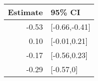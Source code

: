 \begin{tabular}{rl}
  \hline
Estimate & 95\% CI \\ 
  \hline
-0.53 & [-0.66,-0.41] \\ 
  0.10 & [-0.01,0.21] \\ 
  -0.17 & [-0.56,0.23] \\ 
  -0.29 & [-0.57,0] \\ 
   \hline
\end{tabular}

